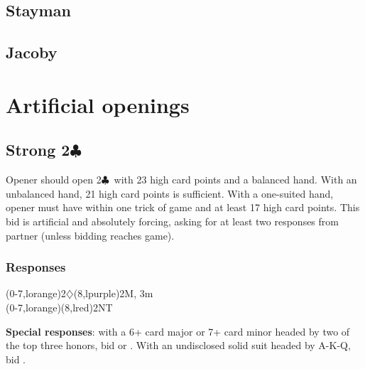 \documentclass[oneside]{memoir}
\def\C{$\clubsuit$}
\def\D{$\diamondsuit$}
\begin{document}
\section{Stayman}

\section{Jacoby}


\chapter{Artificial openings}

\section{Strong 2\C}

Opener should open 2\C\ with 23 high card points and a balanced hand.
With an unbalanced hand, 21 high card points is sufficient.  With a
one-suited hand, opener must have within one trick of game and at least
17 high card points.  This bid is artificial and absolutely forcing,
asking for at least two responses from partner (unless bidding
reaches game).

\subsection{Responses}
\begin{ptable}
\bid*(0-7,lorange){2\D{}}\bid(8,lpurple){2M, 3m}\\
\bid(0-7,lorange){\cdrop[-.45pc]{2\D}}\bid(8,lred){2NT}\\
\end{ptable}
\hskip 1pc\vrule\hskip 1pc
\parbox[t]{4in}{\vskip -1.4pc %
\textbf{Special responses}: with a 6+ card major or 7+ card minor headed by two
of the top three honors, bid  or
.  With an undisclosed solid suit headed by A-K-Q,
bid .  }
\end{document}
